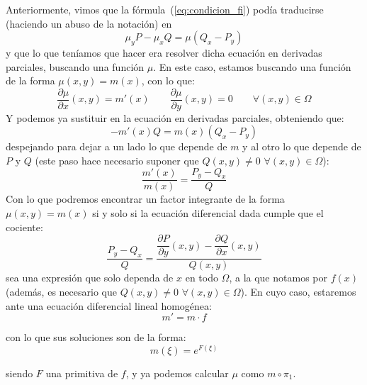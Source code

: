 \noindent
Anteriormente, vimos que la fórmula~(\ref{eq:condicion_fi}) podía traducirse (haciendo un abuso de la notación) en
\begin{equation*}
    \mu_y P -\mu_x Q = \mu(Q_x - P_y)
\end{equation*}
y que lo que teníamos que hacer era resolver dicha ecuación en derivadas parciales, buscando una función $\mu$. En este caso, estamos buscando una función de la forma $\mu(x,y)=m(x)$, con lo que:
\begin{equation*}
    \dfrac{\partial \mu}{\partial x}(x,y) = m'(x) \qquad \dfrac{\partial \mu}{\partial y}(x,y) = 0 \qquad \forall (x,y)\in \Omega
\end{equation*}
Y podemos ya sustituir en la ecuación en derivadas parciales, obteniendo que:
\begin{equation*}
    -m'(x) Q = m(x) (Q_x-P_y)
\end{equation*}
despejando para dejar a un lado lo que depende de $m$ y al otro lo que depende de $P$ y $Q$ (este paso hace necesario suponer que $Q(x,y)\neq 0$ $\forall (x,y)\in \Omega$):
\begin{equation*}
    \dfrac{m'(x)}{m(x)} = \dfrac{P_y-Q_x}{Q}
\end{equation*}
Con lo que podremos encontrar un factor integrante de la forma $\mu(x,y)=m(x)$ si y solo si la ecuación diferencial dada cumple que el cociente:
\begin{equation*}
    \dfrac{P_y-Q_x}{Q} = \dfrac{\dfrac{\partial P}{\partial y}(x,y)-\dfrac{\partial Q}{\partial x}(x,y)}{Q(x,y)}
\end{equation*}
sea una expresión que solo dependa de $x$ en todo $\Omega$, a la que notamos por $f(x)$ (además, es necesario que $Q(x,y)\neq 0$ $\forall (x,y)\in \Omega$). En cuyo caso, estaremos ante una ecuación diferencial lineal homogénea:
\begin{equation*}
    m' = m\cdot f
\end{equation*}

con lo que sus soluciones son de la forma:
\begin{equation*}
    m(\xi) = e^{F(\xi)}
\end{equation*}

siendo $F$ una primitiva de $f$, y ya podemos calcular $\mu$ como $m\circ \pi_1$.

